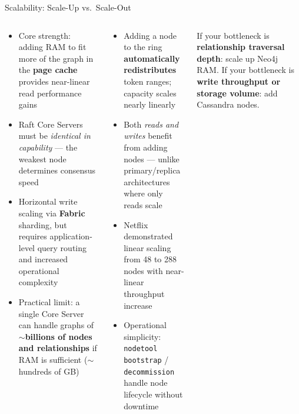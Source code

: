 \documentclass[aspectratio=169]{beamer}
\begin{document}
\begin{frame}{Scalability: Scale-Up vs.\ Scale-Out}
  \begin{columns}[T]
      \begin{tcolorbox}[neo4jbox, title=Neo4j: Vertical Scaling (Scale-Up)]
        \small
        \begin{itemize}
          \item Core strength: adding RAM to fit more of the graph in the \textbf{page cache} provides near-linear read performance gains
          \item Raft Core Servers must be \textit{identical in capability} — the weakest node determines consensus speed
          \item Horizontal write scaling via \textbf{Fabric} sharding, but requires application-level query routing and increased operational complexity
          \item Practical limit: a single Core Server can handle graphs of $\sim$\textbf{billions of nodes and relationships} if RAM is sufficient ($\sim$hundreds of GB)
        \end{itemize}
      \end{tcolorbox}
      \begin{tcolorbox}[cassbox, title=Cassandra: Linear Scale-Out]
        \small
        \begin{itemize}
          \item Adding a node to the ring \textbf{automatically redistributes} token ranges; capacity scales nearly linearly
          \item Both \textit{reads and writes} benefit from adding nodes — unlike primary/replica architectures where only reads scale
          \item Netflix demonstrated linear scaling from 48 to 288 nodes with near-linear throughput increase
          \item Operational simplicity: \texttt{nodetool bootstrap} / \texttt{decommission} handle node lifecycle without downtime
        \end{itemize}
      \end{tcolorbox}
      \vspace{0.2cm}
      \begin{tcolorbox}[deepdivebox, title=Key Insight]
        \scriptsize
        If your bottleneck is \textbf{relationship traversal depth}: scale up Neo4j RAM. If your bottleneck is \textbf{write throughput or storage volume}: add Cassandra nodes.
      \end{tcolorbox}
  \end{columns}
\end{frame}
\end{document}
